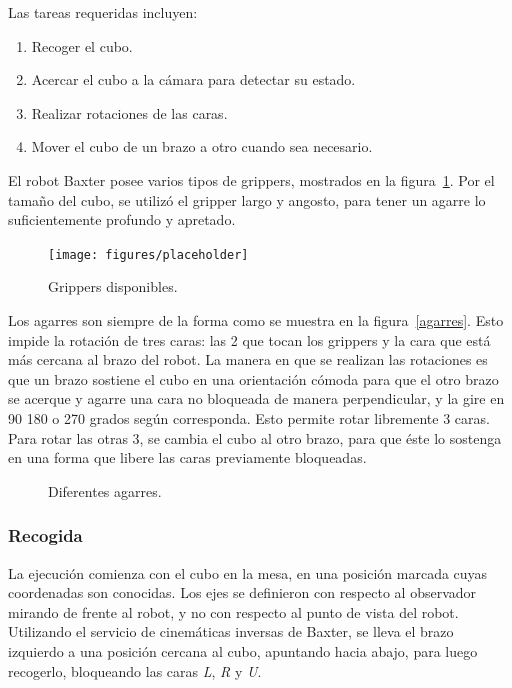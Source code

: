 Las tareas requeridas incluyen:
\begin{enumerate}
	\item Recoger el cubo.
	\item Acercar el cubo a la cámara para detectar su estado.
	\item Realizar rotaciones de las caras.
	\item Mover el cubo de un brazo a otro cuando sea necesario.
\end{enumerate}

El robot Baxter posee varios tipos de grippers, mostrados en la figura~\ref{grippers}. Por el tamaño del cubo, se utilizó el gripper largo y angosto, para tener un agarre lo suficientemente profundo y apretado.

\begin{figure}[h!]
	\centering
	\texttt{[image: figures/placeholder]}
	\caption{Grippers disponibles.}
	\label{grippers}
\end{figure}

Los agarres son siempre de la forma como se muestra en la figura~\ref{agarres}. Esto impide la rotación de tres caras: las 2 que tocan los grippers y la cara que está más cercana al brazo del robot. La manera en que se realizan las rotaciones es que un brazo sostiene el cubo en una orientación cómoda para que el otro brazo se acerque y agarre una cara no bloqueada de manera perpendicular, y la gire en 90 180 o 270 grados según corresponda. Esto permite rotar libremente 3 caras. Para rotar las otras 3, se cambia el cubo al otro brazo, para que éste lo sostenga en una forma que libere las caras previamente bloqueadas.

\begin{figure}[h!]
	\centering
	\hfill
	\hfill
	\hfill
	\caption{Diferentes agarres.}
	\label{agarre}
\end{figure}

\subsubsection{Recogida}
La ejecución comienza con el cubo en la mesa, en una posición marcada cuyas coordenadas son conocidas. Los ejes se definieron con respecto al observador mirando de frente al robot, y no con respecto al punto de vista del robot. Utilizando el servicio de cinemáticas inversas de Baxter, se lleva el brazo izquierdo a una posición cercana al cubo, apuntando hacia abajo, para luego recogerlo, bloqueando las caras \textit{L}, \textit{R} y \textit{U}.

